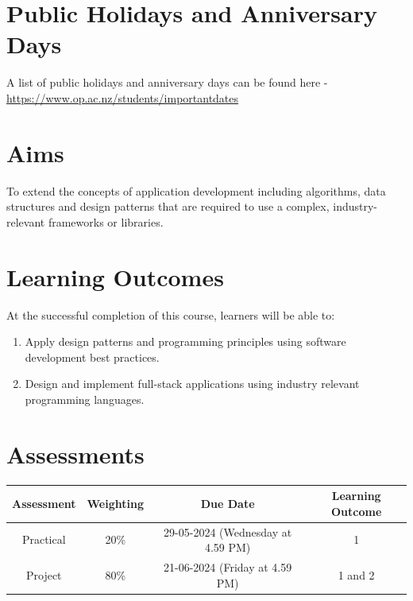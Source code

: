 \documentclass{article}
\begin{document}
\section*{Public Holidays and Anniversary Days}
A list of public holidays and anniversary days can be found here - \href{https://www.op.ac.nz/students/importantdates}{https://www.op.ac.nz/students/importantdates}

\section*{Aims}
To extend the concepts of application development including algorithms, data structures and design patterns that are required to use a complex, industry-relevant frameworks or libraries.

\section*{Learning Outcomes}
At the successful completion of this course, learners will be able to:
\begin{enumerate}
	\item Apply design patterns and programming principles using software development best practices.
	\item Design and implement full-stack applications using industry relevant programming languages.
\end{enumerate}

\section*{Assessments}
\renewcommand{\arraystretch}{1.5}
\begin{tabular}{|c|c|c|c|}
	\hline
	\textbf{Assessment}                                 & \textbf{Weighting} & \textbf{Due Date}            & \textbf{Learning Outcome} \\ \hline
	\small Practical & \small 20\%        & \small 29-05-2024 (Wednesday at 4.59 PM)   & \small 1                   \\ \hline
	\small Project                 & \small 80\%        & \small 21-06-2024 (Friday at 4.59 PM) \small  & \small 1 and 2                   \\ \hline
\end{tabular}
\end{document}

